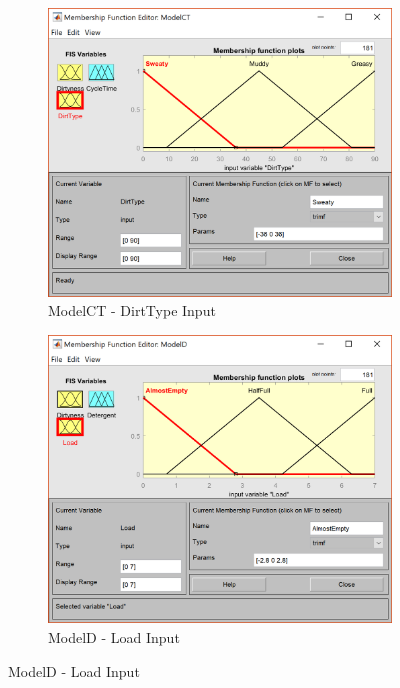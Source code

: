 \documentclass[11pt]{article}
\begin{document}
\begin{enumerate}[label=(\alph*)]
  \begin{figure}[ht!]
  \centering
  \begin{subfigure}{.5\textwidth}
    \centering
    \includegraphics[width=.9\linewidth]{res/image1_dirttype}
    \caption{ModelCT - DirtType Input}
    \label{fig:sub1}
  \end{subfigure}%
  \begin{subfigure}{.5\textwidth}
    \centering
    \includegraphics[width=.9\linewidth]{res/image2_load}
    \caption{ModelD - Load Input}
    \label{fig:sub2}
  \end{subfigure}
  \end{figure}


\end{enumerate}
\end{document}

